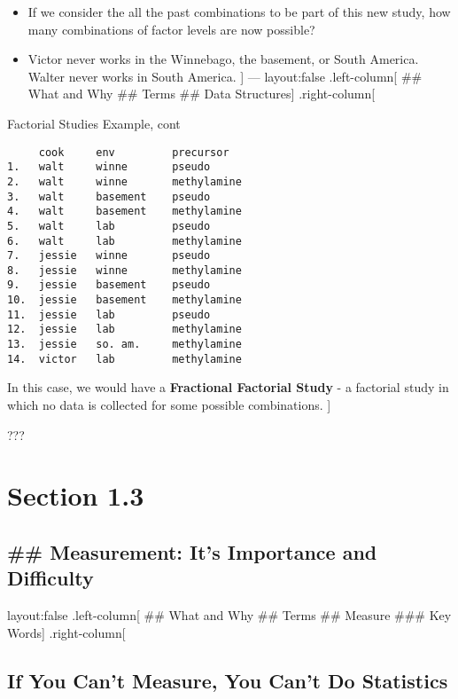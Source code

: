 \documentclass[]{article}
\begin{document}
\begin{itemize}
\item
  If we consider the all the past combinations to be part of this new
  study, how many combinations of factor levels are now possible?
\item
  Victor never works in the Winnebago, the basement, or South America.
  Walter never works in South America. {]} --- layout:false
  .left-column{[} \#\# What and Why \#\# Terms \#\# Data Structures{]}
  .right-column{[}
\end{itemize}

Factorial Studies Example, cont

\begin{verbatim}
     cook     env         precursor
1.   walt     winne       pseudo
2.   walt     winne       methylamine
3.   walt     basement    pseudo
4.   walt     basement    methylamine
5.   walt     lab         pseudo
6.   walt     lab         methylamine
7.   jessie   winne       pseudo
8.   jessie   winne       methylamine
9.   jessie   basement    pseudo
10.  jessie   basement    methylamine
11.  jessie   lab         pseudo
12.  jessie   lab         methylamine
13.  jessie   so. am.     methylamine
14.  victor   lab         methylamine
\end{verbatim}

In this case, we would have a \textbf{Fractional Factorial Study} - a
factorial study in which no data is collected for some possible
combinations. {]}

???

\section{Section 1.3}\label{section-1.3}

\subsection{\#\# Measurement: It's Importance and
Difficulty}\label{measurement-its-importance-and-difficulty}

layout:false .left-column{[} \#\# What and Why \#\# Terms \#\# Measure
\#\#\# Key Words{]} .right-column{[}

\subsection{If You Can't Measure, You Can't Do
Statistics}\label{if-you-cant-measure-you-cant-do-statistics}
\end{document}
